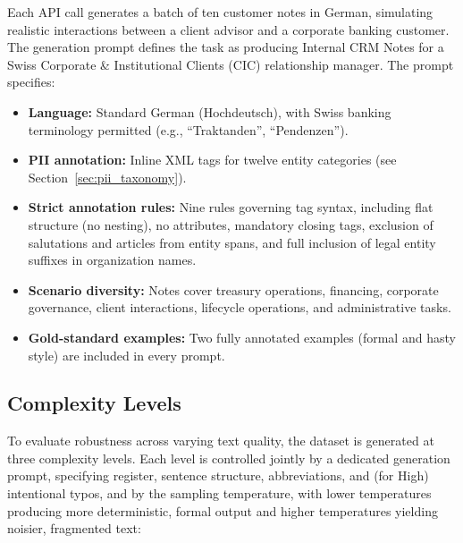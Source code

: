 Each API call generates a batch of ten customer notes in German, simulating
realistic interactions between a client advisor and a corporate banking customer.
The generation prompt defines the task as producing Internal CRM Notes for a Swiss Corporate \& Institutional Clients (CIC)
relationship manager. The prompt specifies:

\begin{itemize}
    \item \textbf{Language:} Standard German (Hochdeutsch), with Swiss banking
    terminology permitted (e.g., ``Traktanden'', ``Pendenzen'').
    \item \textbf{PII annotation:} Inline XML tags for twelve entity categories
    (see Section~\ref{sec:pii_taxonomy}).
    \item \textbf{Strict annotation rules:} Nine rules governing tag syntax,
    including flat structure (no nesting), no attributes, mandatory closing tags,
    exclusion of salutations and articles from entity spans, and full inclusion
    of legal entity suffixes in organization names.
    \item \textbf{Scenario diversity:} Notes cover treasury operations, financing,
    corporate governance, client interactions, lifecycle operations, and
    administrative tasks.
    \item \textbf{Gold-standard examples:} Two fully annotated examples
    (formal and hasty style) are included in every prompt.
\end{itemize}


\subsection{Complexity Levels}
\label{sec:complexity_levels}

To evaluate robustness across varying text quality, the dataset is generated
at three complexity levels. Each level is controlled jointly by a dedicated
generation prompt, specifying register, sentence structure, abbreviations,
and (for High) intentional typos, and by the sampling temperature, with
lower temperatures producing more deterministic, formal output and higher
temperatures yielding noisier, fragmented text:


